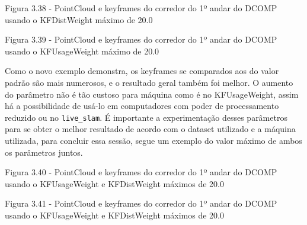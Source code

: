 Figura 3.38 - PointCloud e keyframes do corredor do 1º andar do DCOMP usando o KFDistWeight máximo de 20.0

Figura 3.39 - PointCloud e keyframes do corredor do 1º andar do DCOMP usando o KFUsageWeight máximo de 20.0

Como o novo exemplo demonstra, os keyframes se comparados aos do valor padrão são mais numerosos, e o resultado geral também foi melhor. O aumento do parâmetro não é tão custoso para máquina como é no KFUsageWeight, assim  há a possibilidade de usá-lo em computadores com poder de processamento reduzido ou no \texttt{live\_slam}. É importante a experimentação desses parâmetros para se obter o melhor resultado de acordo com o dataset utilizado e a máquina utilizada, para concluir essa sessão, segue um exemplo do valor máximo de ambos os parâmetros juntos.

Figura 3.40 - PointCloud e keyframes do corredor do 1º andar do DCOMP usando o KFUsageWeight e KFDistWeight máximos de 20.0

Figura 3.41 - PointCloud e keyframes do corredor do 1º andar do DCOMP usando o KFUsageWeight e KFDistWeight máximos de 20.0

